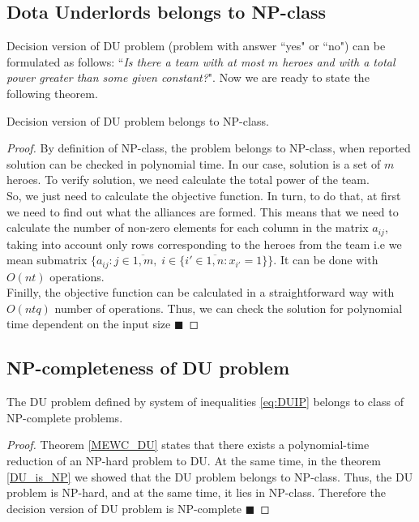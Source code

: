 \documentclass[smallextended]{svjour3}       %
\begin{document}
\subsection{Dota Underlords belongs to NP-class}
Decision version of DU problem (problem with answer ``yes" or ``no") can be formulated as follows: ``\textit{Is there a team with at most $ m $ heroes and with a total power greater than some given constant?}".
Now we are ready to state the following theorem.
\begin{theorem}
\label{DU_is_NP}
Decision version of DU problem belongs to NP-class.
\end{theorem}
\begin{proof}
By definition of NP-class, the problem belongs to NP-class, when reported solution can be checked in polynomial time.
In our case, solution is a set of $m$ heroes. To verify solution, we need calculate the total power of the team.\\
So, we just need to calculate the objective function.
In turn, to do that, at first we need to find out what the alliances are formed.
This means that we need to calculate the number of non-zero elements for each column in the matrix $a_{ij}$, taking into account only rows corresponding to the heroes from the team i.e  we mean submatrix $\{a_{ij}:  j \in \overline{1,m},\; i \in \{  i' \in \overline{1,n} :   x_{i'} = 1 \}  \}$.
It can be done with $O(nt)$ operations.\\
Finilly, the objective function can be calculated in a straightforward way with $O(ntq)$ number of operations.
Thus, we can check the solution for polynomial time dependent on the input size  $\blacksquare$
\end{proof}

\subsection{NP-completeness of DU problem}
\begin{theorem}
	The DU problem defined by system of inequalities \eqref{eq:DUIP} belongs to class of NP-complete problems.
\end{theorem}

\begin{proof}
Theorem \ref{MEWC_DU} states that there exists a polynomial-time reduction of an NP-hard problem to DU.
At the same time, in the theorem \ref{DU_is_NP} we showed that the DU problem belongs to NP-class.
Thus, the DU problem is NP-hard, and at the same time, it lies in NP-class.
Therefore the decision version of DU problem is NP-complete $\blacksquare$
\end{proof}
\end{document}

